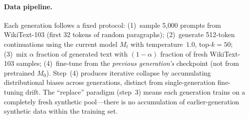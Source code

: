 \begin{table}[H]
\centering
\small
\caption{Metric drift (\%, generation~0$\to$10) for Pythia-410M across contamination levels. Diversity collapse occurs at all $\alpha$ levels, with the strongest decline at low-to-moderate contamination ($\alpha{=}0.25$: distinct-1 $-40.3{\pm}0.3\%$) rather than full replacement ($\alpha{=}1.0$: $-27.8{\pm}1.6\%$). $^\dagger$$\alpha{=}0.10$: single seed (seed~42, preliminary). $\alpha{=}0.00$, $\alpha{=}0.25$, $\alpha{=}0.50$, $\alpha{=}0.75$: 3-seed mean${\pm}$std (seeds 42, 43, 44); $\alpha{=}1.0$: 4-seed mean${\pm}$std (seeds 42, 43, 44, 45).}
\label{tab:drift_summary}
\end{table}

\paragraph{Data pipeline.}
Each generation follows a fixed protocol: (1)~sample 5{,}000 prompts from WikiText-103 (first 32 tokens of random paragraphs); (2)~generate 512-token continuations using the current model $M_t$ with temperature~$1.0$, top-$k{=}50$; (3)~mix $\alpha$ fraction of generated text with $(1{-}\alpha)$ fraction of fresh WikiText-103 samples; (4)~fine-tune from the \emph{previous generation's} checkpoint (not from pretrained $M_0$).
Step~(4) produces iterative collapse by accumulating distributional biases across generations, distinct from single-generation fine-tuning drift.
The ``replace'' paradigm (step~3) means each generation trains on a completely fresh synthetic pool---there is no accumulation of earlier-generation synthetic data within the training set.

